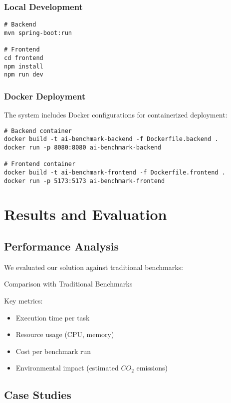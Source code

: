 \subsection{Local Development}
\begin{verbatim}
# Backend
mvn spring-boot:run

# Frontend
cd frontend
npm install
npm run dev
\end{verbatim}

\subsection{Docker Deployment}
The system includes Docker configurations for containerized deployment:

\begin{verbatim}
# Backend container
docker build -t ai-benchmark-backend -f Dockerfile.backend .
docker run -p 8080:8080 ai-benchmark-backend

# Frontend container
docker build -t ai-benchmark-frontend -f Dockerfile.frontend .
docker run -p 5173:5173 ai-benchmark-frontend
\end{verbatim}

\chapter{Results and Evaluation}

\section{Performance Analysis}

We evaluated our solution against traditional benchmarks:

\begin{table}[h]
    \centering
    \caption{Comparison with Traditional Benchmarks}
    \label{tab:comparison}
\end{table}

Key metrics:
\begin{itemize}
    \item Execution time per task
    \item Resource usage (CPU, memory)
    \item Cost per benchmark run
    \item Environmental impact (estimated $CO_2$ emissions)
\end{itemize}

\section{Case Studies}

